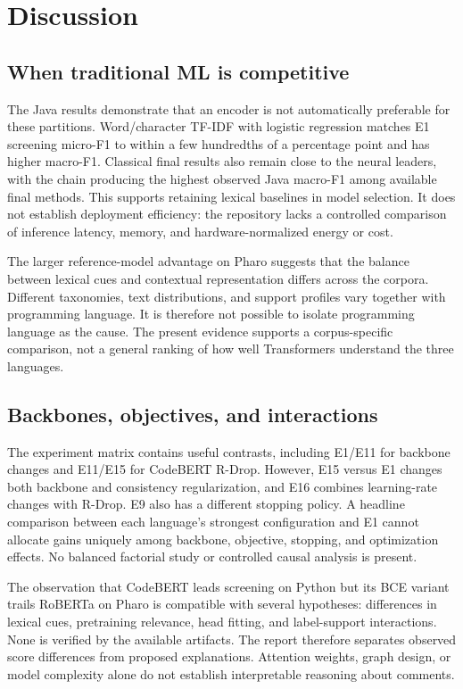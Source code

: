 \section{Discussion}
\subsection{When traditional ML is competitive}
The Java results demonstrate that an encoder is not automatically preferable for these partitions. Word/character TF-IDF with logistic regression matches E1 screening micro-F1 to within a few hundredths of a percentage point and has higher macro-F1. Classical final results also remain close to the neural leaders, with the chain producing the highest observed Java macro-F1 among available final methods. This supports retaining lexical baselines in model selection. It does not establish deployment efficiency: the repository lacks a controlled comparison of inference latency, memory, and hardware-normalized energy or cost.

The larger reference-model advantage on Pharo suggests that the balance between lexical cues and contextual representation differs across the corpora. Different taxonomies, text distributions, and support profiles vary together with programming language. It is therefore not possible to isolate programming language as the cause. The present evidence supports a corpus-specific comparison, not a general ranking of how well Transformers understand the three languages.

\subsection{Backbones, objectives, and interactions}
The experiment matrix contains useful contrasts, including E1/E11 for backbone changes and E11/E15 for CodeBERT R-Drop. However, E15 versus E1 changes both backbone and consistency regularization, and E16 combines learning-rate changes with R-Drop. E9 also has a different stopping policy. A headline comparison between each language's strongest configuration and E1 cannot allocate gains uniquely among backbone, objective, stopping, and optimization effects. No balanced factorial study or controlled causal analysis is present.

The observation that CodeBERT leads screening on Python but its BCE variant trails RoBERTa on Pharo is compatible with several hypotheses: differences in lexical cues, pretraining relevance, head fitting, and label-support interactions. None is verified by the available artifacts. The report therefore separates observed score differences from proposed explanations. Attention weights, graph design, or model complexity alone do not establish interpretable reasoning about comments.

